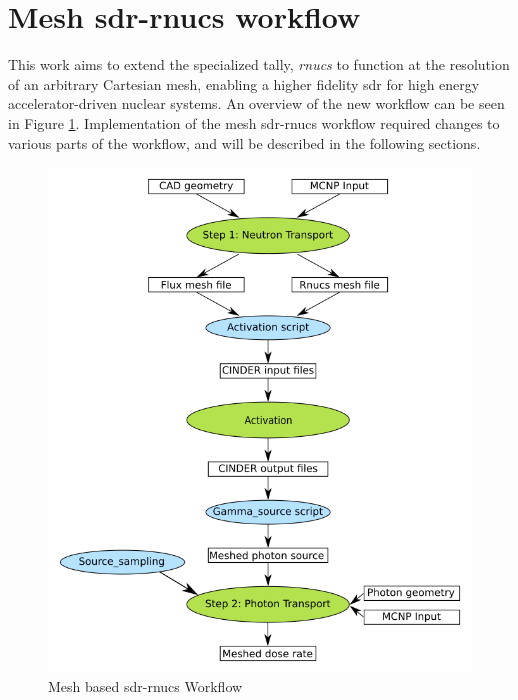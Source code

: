 \section{Mesh \gls{sdr}-rnucs workflow}
%
This work aims to extend the specialized tally, \emph{rnucs} to function at
the resolution of an arbitrary Cartesian mesh, enabling a higher fidelity
\gls{sdr} for high energy accelerator-driven nuclear systems. An overview of the
new workflow can be seen in Figure \ref{fig:mesh_rnucs}.
Implementation of the mesh \gls{sdr}-rnucs workflow required changes to
various parts of the workflow, and will be described in the following sections.
\begin{figure}[H]
	\centering
	\includegraphics[scale=0.5]{../figs/rnucs_mesh.png}
	\caption{Mesh based \gls{sdr}-rnucs Workflow}
	\label{fig:mesh_rnucs}
\end{figure}
%
%
